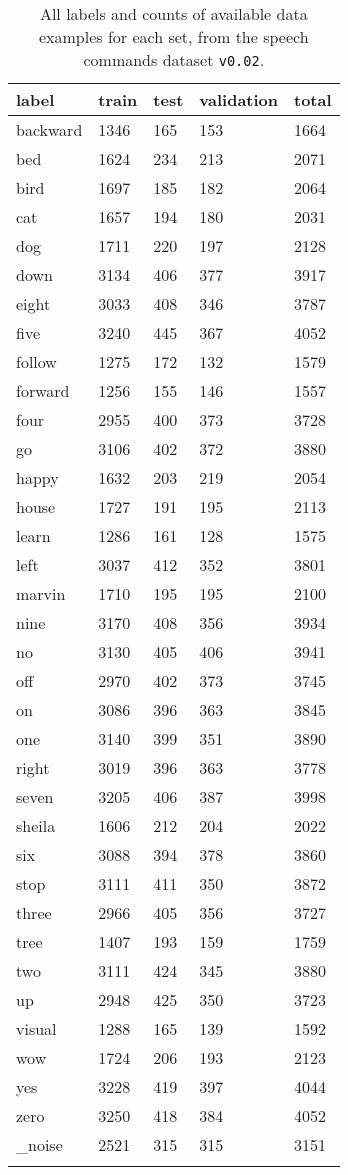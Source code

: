 \begin{table}[ht!]
\begin{center}
\caption{All labels and counts of available data examples for each set, from  the speech commands dataset \texttt{v0.02}.}
\begin{tabular}{ M{2cm}  M{1.5cm}  M{1.5cm}  M{1.5cm}  M{1.5cm} }
\toprule
\textbf{label} & \textbf{train} & \textbf{test} & \textbf{validation} & \textbf{total} \\
\midrule
backward & 1346 & 165 & 153 & 1664 \\
bed & 1624 & 234 & 213 & 2071 \\
bird & 1697 & 185 & 182 & 2064 \\
cat & 1657 & 194 & 180 & 2031 \\
dog & 1711 & 220 & 197 & 2128 \\
down & 3134 & 406 & 377 & 3917 \\
eight & 3033 & 408 & 346 & 3787 \\
five & 3240 & 445 & 367 & 4052 \\
follow & 1275 & 172 & 132 & 1579 \\
forward & 1256 & 155 & 146 & 1557 \\
four & 2955 & 400 & 373 & 3728 \\
go & 3106 & 402 & 372 & 3880 \\
happy & 1632 & 203 & 219 & 2054 \\
house & 1727 & 191 & 195 & 2113 \\
learn & 1286 & 161 & 128 & 1575 \\
left & 3037 & 412 & 352 & 3801 \\
marvin & 1710 & 195 & 195 & 2100 \\
nine & 3170 & 408 & 356 & 3934 \\
no & 3130 & 405 & 406 & 3941 \\
off & 2970 & 402 & 373 & 3745 \\
on & 3086 & 396 & 363 & 3845 \\
one & 3140 & 399 & 351 & 3890 \\
right & 3019 & 396 & 363 & 3778 \\
seven & 3205 & 406 & 387 & 3998 \\
sheila & 1606 & 212 & 204 & 2022 \\
six & 3088 & 394 & 378 & 3860 \\
stop & 3111 & 411 & 350 & 3872 \\
three & 2966 & 405 & 356 & 3727 \\
tree & 1407 & 193 & 159 & 1759 \\
two & 3111 & 424 & 345 & 3880 \\
up & 2948 & 425 & 350 & 3723 \\
visual & 1288 & 165 & 139 & 1592 \\
wow & 1724 & 206 & 193 & 2123 \\
yes & 3228 & 419 & 397 & 4044 \\
zero & 3250 & 418 & 384 & 4052 \\
\_noise\footnotemark & 2521 & 315 & 315 & 3151 \\
\bottomrule
\label{tab:exp_dataset_all_labels}
\end{tabular}
\end{center}
\end{table}
\FloatBarrier
\noindent
{}


